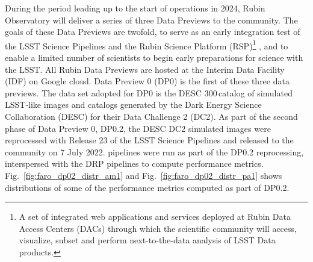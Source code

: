 During the period leading up to the start of operations in 2024, Rubin Observatory will deliver a series of three Data Previews to the community. 
The goals of these Data Previews are twofold, to serve as an early integration test of the LSST Science Pipelines and the Rubin Science Platform (RSP)\footnote{A set of integrated web applications and services deployed at Rubin Data Access Centers (DACs) through which the scientific community will access, visualize, subset and perform next-to-the-data analysis of LSST Data products.} \cite{lse-319}, and to enable a limited number of scientists to begin early preparations for science with the LSST.
All  Rubin Data Previews are hosted at the Interim Data Facility (IDF) on Google cloud\cite{2021arXiv211115030O}.
Data Preview 0 (DP0) \cite{RTN-001} is the first of these three data previews.
The data set adopted for DP0 is the DESC 300\,\degsq catalog of simulated LSST-like images and catalogs generated by the Dark Energy Science Collaboration (DESC) for their Data Challenge 2 (DC2)\cite{2021ApJS..253...31L}.
As part of the second phase of Data Preview 0, DP0.2, the DESC DC2 simulated images were reprocessed with Release 23 of the LSST Science Pipelines and released to the community on 7 July 2022.
\faro pipelines were run as part of the DP0.2 reprocessing, interspersed with the DRP pipelines to compute performance metrics. 
Fig.~\ref{fig:faro_dp02_distr_am1} and Fig.~\ref{fig:faro_dp02_distr_pa1} shows distributions of some of the performance metrics computed as part of DP0.2.

